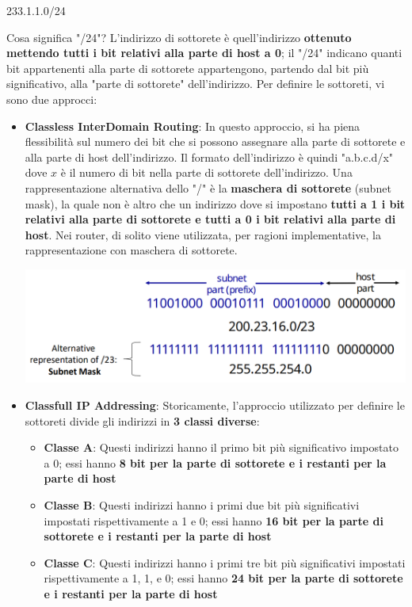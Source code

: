 \documentclass[12pt]{article}
\begin{document}
\begin{center}
    233.1.1.0/24
\end{center}
Cosa significa "/24"? L'indirizzo di sottorete è quell'indirizzo \textbf{ottenuto mettendo tutti i bit relativi alla parte di host a 0}; il "/24" indicano quanti bit appartenenti alla parte di sottorete
appartengono, partendo dal bit più significativo, alla "parte di sottorete" dell'indirizzo.
Per definire le sottoreti, vi sono due approcci:
\begin{itemize}
    \item \textbf{Classless InterDomain Routing}: In questo approccio, si ha piena flessibilità sul numero dei bit che si possono assegnare alla parte di sottorete e alla parte di host dell'indirizzo.
    Il formato dell'indirizzo è quindi "a.b.c.d/x" dove $x$ è il numero di bit nella parte di sottorete dell'indirizzo. Una rappresentazione alternativa dello "/" è la \textbf{maschera di sottorete} (subnet mask),
    la quale non è altro che un indirizzo dove si impostano \textbf{tutti a 1 i bit relativi alla parte di sottorete e tutti a 0 i bit relativi alla parte di host}. Nei router, di solito viene utilizzata, per ragioni implementative,
    la rappresentazione con maschera di sottorete.
    \begin{center}
        \includegraphics[width =0.80\linewidth]{Images/85.png}
    \end{center}
    \item \textbf{Classfull IP Addressing}: Storicamente, l'approccio utilizzato per definire le sottoreti divide gli indirizzi in \textbf{3 classi diverse}:
    \begin{itemize}
        \item \textbf{Classe A}: Questi indirizzi hanno il primo bit più significativo impostato a 0; essi hanno \textbf{8 bit per la parte di sottorete e i restanti per la parte di host}
        \item \textbf{Classe B}: Questi indirizzi hanno i primi due bit più significativi impostati rispettivamente a 1 e 0; essi hanno \textbf{16 bit per la parte di sottorete e i restanti per la parte di host}
        \item \textbf{Classe C}: Questi indirizzi hanno i primi tre bit più significativi impostati rispettivamente a 1, 1, e 0; essi hanno \textbf{24 bit per la parte di sottorete e i restanti per la parte di host}

\end{itemize}
\end{itemize}
\end{document}
